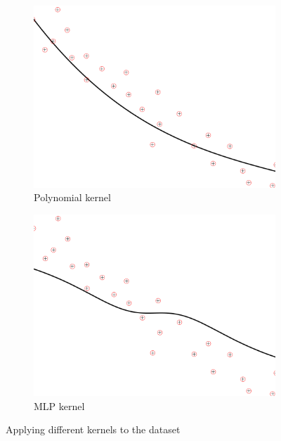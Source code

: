 \documentclass[a4paper, 11pt, one column]{article}
\begin{document}
\begin{figure}[]
\begin{subfigure}{0.33\linewidth}
            \includegraphics[width=\linewidth]{images/poly_3=0.png}
            \caption{Polynomial kernel}
        \end{subfigure}\hfil
        \begin{subfigure}{0.33\linewidth}
            \includegraphics[width=\linewidth]{images/MLP_e=0.png}
            \caption{MLP kernel}
        \end{subfigure}\hfil
        \caption{Applying different kernels to the dataset}
        \label{fig:simplelineardataset}
\end{figure}
\end{document}
